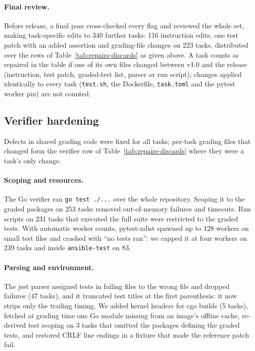 \paragraph{Final review.}
Before release, a final pass cross-checked every flag and reviewed the whole set, making task-specific edits to 340 further tasks: 116 instruction edits, one test patch with an added assertion and grading-file changes on 223 tasks, distributed over the rows of Table~\ref{tab:repairs-discards} as given above. A task counts as repaired in the table if one of its own files changed between v1.0 and the release (instruction, test patch, graded-test list, parser or run script); changes applied identically to every task (\texttt{test.sh}, the Dockerfile, \texttt{task.toml} and the pytest worker pin) are not counted.


\subsection{Verifier hardening}
\label{sec:verifier}

Defects in shared grading code were fixed for all tasks; per-task grading files that changed form the verifier row of Table~\ref{tab:repairs-discards} where they were a task's only change.

\paragraph{Scoping and resources.}
The Go verifier ran \texttt{go test ./...} over the whole repository. Scoping it to the graded packages on 253 tasks removed out-of-memory failures and timeouts. Run scripts on 231 tasks that executed the full suite were restricted to the graded tests. With automatic worker counts, pytest-xdist spawned up to 128 workers on small test files and crashed with ``no tests ran'': we capped it at four workers on 239 tasks and inside \texttt{ansible-test} on 83.

\paragraph{Parsing and environment.}
The jest parser assigned tests in failing files to the wrong file and dropped failures (47 tasks), and it truncated test titles at the first parenthesis: it now strips only the trailing timing. We added kernel headers for cgo builds (5 tasks), fetched at grading time one Go module missing from an image's offline cache, re-derived test scoping on 3 tasks that omitted the packages defining the graded tests, and restored CRLF line endings in a fixture that made the reference patch fail.

